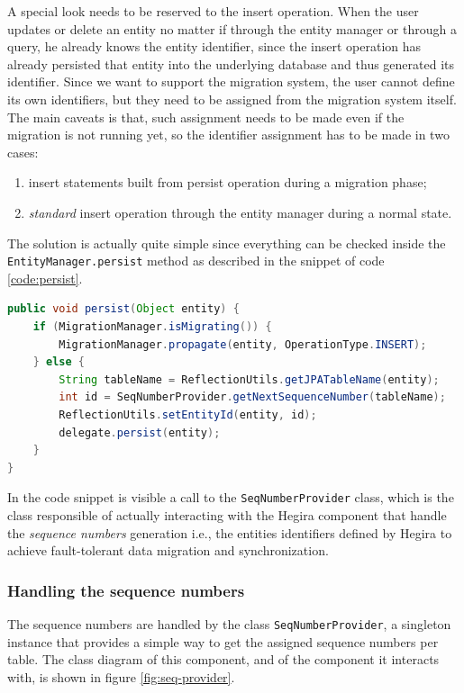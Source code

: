 \noindent A special look needs to be reserved to the insert operation. When the user updates or delete an entity no matter if through the entity manager or through a query, he already knows the entity identifier, since the insert operation has already persisted that entity into the underlying database and thus generated its identifier.
Since we want to support the migration system, the user cannot define its own identifiers, but they need to be assigned from the migration system itself.
The main caveats is that, such assignment needs to be made even if the migration is not running yet, so the identifier assignment has to be made in two cases:
\begin{enumerate}
\item insert statements built from persist operation during a migration phase;
\item \textit{standard} insert operation through the entity manager during a normal state.
\end{enumerate}

\noindent The solution is actually quite simple since everything can be checked inside the \texttt{EntityManager.persist} method as described in the snippet of code \ref{code:persist}.

\begin{lstlisting}[language=Java, caption=Persist operation, label=code:persist]
public void persist(Object entity) {
    if (MigrationManager.isMigrating()) {
        MigrationManager.propagate(entity, OperationType.INSERT);
    } else {
        String tableName = ReflectionUtils.getJPATableName(entity);
        int id = SeqNumberProvider.getNextSequenceNumber(tableName);
        ReflectionUtils.setEntityId(entity, id);
        delegate.persist(entity);
    }
}
\end{lstlisting}

\noindent In the code snippet is visible a call to the  \texttt{SeqNumberProvider} class, which is the class responsible of actually interacting with the Hegira component that handle the \textit{sequence numbers} generation i.e., the entities identifiers defined by Hegira to achieve fault-tolerant data migration and synchronization. 

\subsubsection{Handling the sequence numbers}
The sequence numbers are handled by the class \texttt{SeqNumberProvider}, a singleton instance that provides a simple way to get the assigned sequence numbers per table.
\noindent The class diagram of this component, and of the component it interacts with, is shown in figure \ref{fig:seq-provider}.

